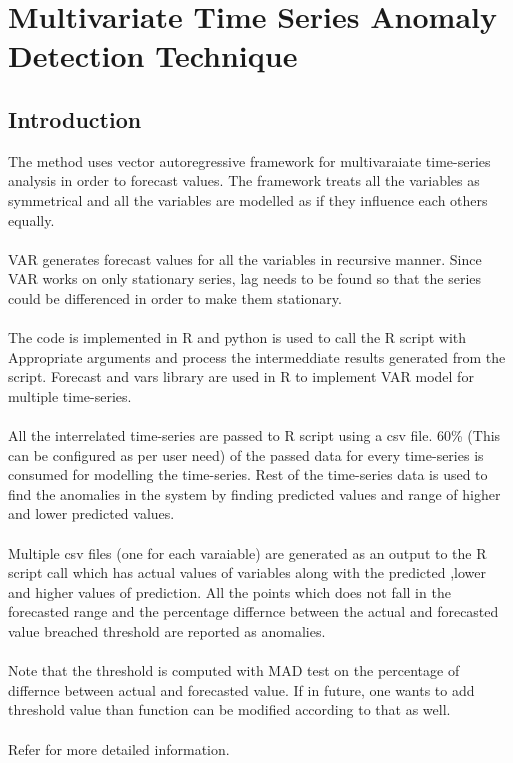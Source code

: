 \chapter{Multivariate Time Series Anomaly Detection Technique}

\section{Introduction}

The method uses vector autoregressive framework for multivaraiate time-series analysis
in order to forecast values. The framework treats all the variables as symmetrical
and all the variables are modelled as if they influence each others equally.\\
\\
VAR generates forecast values for all the variables in recursive manner. Since VAR 
works on only stationary series, lag needs to be found so that the series could be
differenced in order to make them stationary.\\
\\
The code is implemented in R and python is used to call the R script with Appropriate 
arguments and process the intermeddiate results generated from the script. Forecast and 
vars library are used in R to implement VAR model for multiple time-series.\\
\\
All the interrelated time-series are passed to R script using a csv file. 60\% 
(This can be configured as per user need) of the passed data for every time-series 
is consumed for modelling the time-series. Rest of the time-series data is used to 
find the anomalies in the system by finding predicted values and range of higher and lower
predicted values.\\
\\
Multiple csv files (one for each varaiable) are generated as an output to the R script 
call which has actual values of variables along with the predicted ,lower and higher 
values of prediction. All the points which does not fall in the forecasted range and 
the percentage differnce between the actual and forecasted value breached threshold 
are reported as anomalies.\\
\\
Note that the threshold is computed with MAD test on the percentage of differnce between actual and forecasted value.
If in future, one wants to add threshold value than function can be modified according to that as well.\\
\\
Refer \cite{var} for more detailed information.

